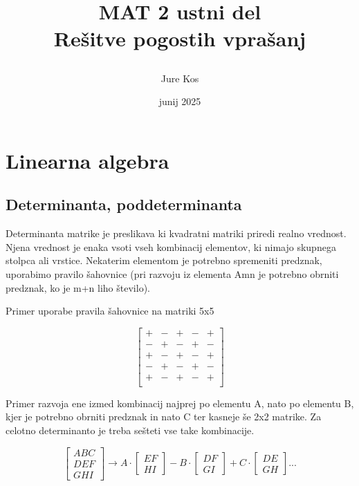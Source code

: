 \documentclass[12pt]{report}
\title{

  {MAT 2 ustni del}\\
  {\small Rešitve pogostih vprašanj}\\

}
\date{junij 2025}
\author{Jure Kos}
\begin{document}
\maketitle


\chapter*{Linearna algebra}


\section*{Determinanta, poddeterminanta}
Determinanta matrike je preslikava ki kvadratni matriki priredi realno vrednost. Njena vrednost je enaka vsoti vseh kombinacij elementov, ki nimajo skupnega stolpca ali vrstice. Nekaterim elementom je potrebno spremeniti predznak, uporabimo pravilo šahovnice (pri razvoju iz elementa Amn je potrebno obrniti predznak, ko je m+n liho število).



Primer uporabe pravila šahovnice na matriki 5x5

\[
\begin{bmatrix}
+ & - & + & - & + \\ 
- & + & - & + & - \\ 
+ & - & + & - & + \\ 
- & + & - & + & - \\ 
+ & - & + & - & + \\
\end{bmatrix}
\]


Primer razvoja ene izmed kombinacij najprej po elementu A, nato po elementu B, kjer je potrebno obrniti predznak in nato C ter kasneje še 2x2 matrike. Za celotno determinanto je treba sešteti vse take kombinacije.

\[
\begin{bmatrix} A B C \\ D E F \\ G H I \end{bmatrix} \rightarrow A \cdot 
\begin{bmatrix} E F \\ H I \end{bmatrix} - B \cdot
\begin{bmatrix} D F \\ G I \end{bmatrix} + C \cdot 
\begin{bmatrix} D E \\ G H \end{bmatrix} ...
\]
\end{document}
